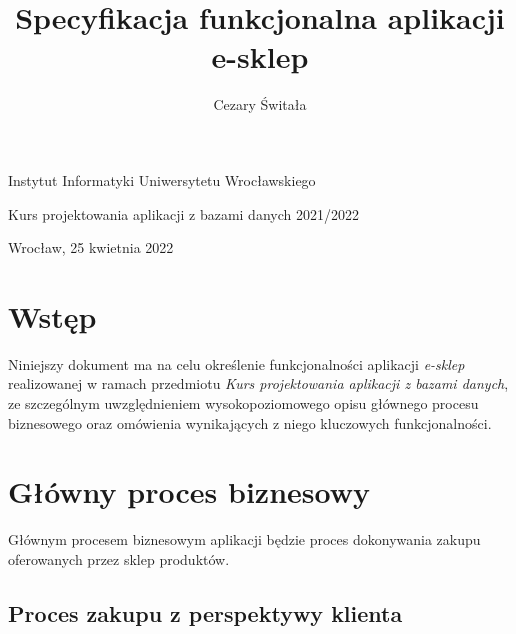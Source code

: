 \documentclass[a4paper]{article}
\author{Cezary Świtała}
\title{Specyfikacja funkcjonalna aplikacji e-sklep}
\begin{document}
\makeatletter
\begin{titlepage}
    \centering

    \large Instytut Informatyki Uniwersytetu Wrocławskiego

    \vspace*{6cm}

    \large \@author

    \vspace{0.5cm}

    \huge \@title

    \vspace{0.5cm}

    \Large Kurs projektowania aplikacji z bazami danych 2021/2022

    \vspace{1.5cm}

    \vfill

    \large Wrocław, 25 kwietnia 2022
\end{titlepage}
\makeatother
{}

\setcounter{page}{2}


\begin{versionhistory}
\end{versionhistory}

\newpage

\section{Wstęp}

Niniejszy dokument ma na celu określenie funkcjonalności aplikacji \emph{e-sklep} realizowanej w ramach przedmiotu \emph{Kurs projektowania aplikacji z bazami danych}, ze szczególnym uwzględnieniem wysokopoziomowego opisu głównego procesu biznesowego oraz omówienia wynikających z niego kluczowych funkcjonalności.

\section{Główny proces biznesowy}

Głównym procesem biznesowym aplikacji będzie proces dokonywania zakupu oferowanych przez sklep produktów.

\subsection{Proces zakupu z perspektywy klienta}
\end{document}
